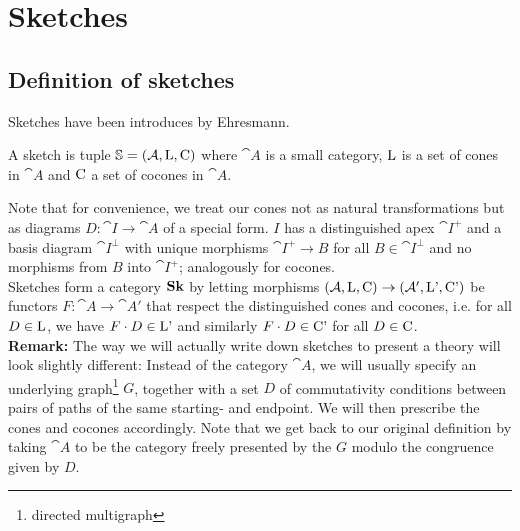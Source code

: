 \section{Sketches}
\label{sec:sketches}

\subsection{Definition of sketches}

Sketches have been introduces by Ehresmann. \\

\begin{Definition}[Sketch]
A sketch is tuple $\mathbb S = (\mathcal{A}, \textrm{L}, \textrm{C})$ where $\cat A$ is a small category, $\textrm{L}$ is a set of cones in $\cat A$ and $\textrm{C}$ a set of cocones in $\cat A$.
\end{Definition}
Note that for convenience, we treat our cones not as natural transformations but as diagrams $D : \cat I \to \cat A$ of a special form. $I$ has a distinguished apex $\cat I^+$ and a basis diagram $\cat I^\bot$ with unique morphisms $\cat I^+ \to B$ for all $B \in \cat I^\bot$ and no morphisms from $B$ into $\cat I^+$; analogously for cocones. \\

Sketches form a category $\mathbf{Sk}$ by letting morphisms $(\mathcal{A}, \textrm{L}, \textrm{C}) \to (\mathcal{A}', \textrm{L'}, \textrm{C'})$ be functors $F : \cat A \to \cat A'$ that respect the distinguished cones and cocones, i.e. for all $D \in \textrm{L}$, we have $F \cdot D \in \textrm{L'}$ and similarly $F \cdot D \in \textrm{C'}$ for all $D \in \textrm{C}$. \\

\textbf{Remark: } The way we will actually write down sketches to present a theory will look slightly different: Instead of the category $\cat A$, we will usually specify an underlying graph\footnote{directed multigraph} $G$, together with a set $D$ of commutativity conditions between pairs of paths of the same starting- and endpoint. We will then prescribe the cones and cocones accordingly. Note that we get back to our original definition by taking $\cat A$ to be the category freely presented by the $G$ modulo the congruence given by $D$. 

